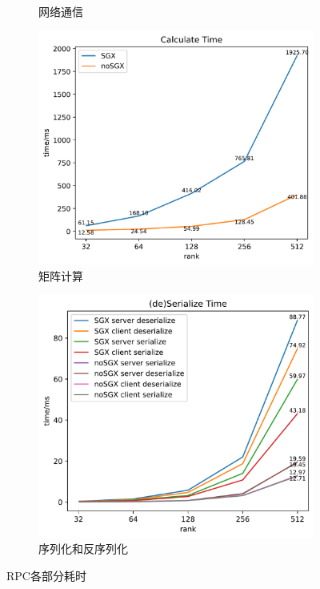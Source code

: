 \begin{figure}[!ht]
\begin{subfigure}{0.4\textwidth}
        \caption{网络通信}
    \end{subfigure}
    \begin{subfigure}{0.4\textwidth}
        \centering
        \includegraphics[width=\textwidth]{figures/matrix_calculate.pdf}
        \caption{矩阵计算}
    \end{subfigure}
    \begin{subfigure}{0.4\textwidth}
        \centering
        \includegraphics[width=\textwidth]{figures/matrix_serialize.pdf}
        \caption{序列化和反序列化}
    \end{subfigure}
    \caption{RPC各部分耗时}
    \label{fig:matrix-evaluation}
\end{figure}

